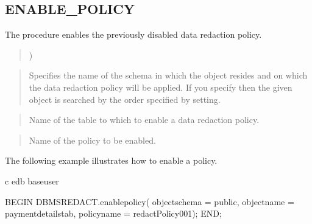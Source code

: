 \documentclass[letterpaper,10pt,english,openany,oneside]{sphinxmanual}
\begin{document}
\ignorespaces 

\subsection{ENABLE\_POLICY}
\label{\detokenize{dbms_redact:enable-policy}}\label{\detokenize{dbms_redact:index-5}}
The  procedure enables the previously disabled data
redaction policy.

\begin{quote}




)
\end{quote}


\begin{quote}

Specifies the name of the schema in which the object resides and on
which the data redaction policy will be applied. If you specify 
then the given object is searched by the order specified by 
setting.
\end{quote}

\begin{quote}

Name of the table to which to enable a data redaction policy.
\end{quote}

\begin{quote}

Name of the policy to be enabled.
\end{quote}


The following example illustrates how to enable a policy.

%
\begin{sphinxVerbatim}[commandchars=\\\{\}]
\PYGZbs{}c edb base\PYGZus{}user

BEGIN
  DBMS\PYGZus{}REDACT.enable\PYGZus{}policy(
    object\PYGZus{}schema =\PYGZgt{} \PYGZsq{}public\PYGZsq{},
    object\PYGZus{}name =\PYGZgt{} \PYGZsq{}payment\PYGZus{}details\PYGZus{}tab\PYGZsq{},
    policy\PYGZus{}name =\PYGZgt{} \PYGZsq{}redactPolicy\PYGZus{}001\PYGZsq{});
END;
\end{sphinxVerbatim}
\end{document}
